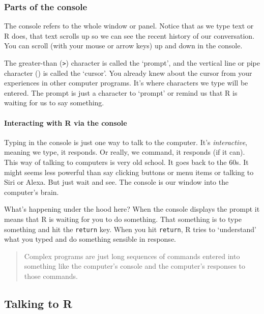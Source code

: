 \documentclass[]{article}
\let\oldparagraph\paragraph
\renewcommand{\paragraph}[1]{\oldparagraph{#1}\mbox{}}
\begin{document}
\subsubsection{Parts of the console}\label{parts-of-the-console}

The console refers to the whole window or panel. Notice that as we type
text or R does, that text scrolls up so we can see the recent history of
our conversation. You can scroll (with your mouse or arrow keys) up and
down in the console.

The greater-than (\texttt{\textgreater{}}) character is called the
`prompt', and the vertical line or pipe character (\texttt{\textbar{}})
is called the `cursor'. You already knew about the cursor from your
experiences in other computer programs. It's where characters we type
will be entered. The prompt is just a character to `prompt' or remind us
that R is waiting for us to say something.

\paragraph{Interacting with R via the
console}\label{interacting-with-r-via-the-console}

Typing in the console is just one way to talk to the computer. It's
\emph{interactive}, meaning we type, it responds. Or really, we command,
it responds (if it can). This way of talking to computers is very old
school. It goes back to the 60s. It might seems less powerful than say
clicking buttons or menu items or talking to Siri or Alexa. But just
wait and see. The console is our window into the computer's brain.

What's happening under the hood here? When the console displays the
prompt it means that R is waiting for you to do something. That
something is to type something and hit the \texttt{return} key. When you
hit \texttt{return}, R tries to `understand' what you typed and do
something sensible in response.

\begin{quote}
Complex programs are just long sequences of commands entered into
something like the computer's console and the computer's responses to
those commands.
\end{quote}

\subsection{Talking to R}\label{talking-to-r}
\end{document}
